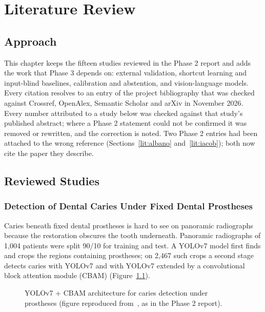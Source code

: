 \chapter{Literature Review}
\label{ch:lit}

\section{Approach}

This chapter keeps the fifteen studies reviewed in the Phase 2 report and adds the work that Phase 3
depends on: external validation, shortcut learning and input-blind baselines, calibration and
abstention, and vision-language models. Every citation resolves to an entry of the project
bibliography that was checked against Crossref, OpenAlex, Semantic Scholar and arXiv in November
2026. Every number attributed to a study below was checked against that study's published abstract;
where a Phase 2 statement could not be confirmed it was removed or rewritten, and the correction is
noted. Two Phase 2 entries had been attached to the wrong reference (Sections~\ref{lit:albano}
and~\ref{lit:iacob}); both now cite the paper they describe.

\section{Reviewed Studies}

\subsection{Detection of Dental Caries Under Fixed Dental Prostheses~\cite{ayhan2025detection}}
 Caries beneath fixed dental prostheses is hard to see on panoramic
radiographs because the restoration obscures the tooth underneath.
 Panoramic radiographs of 1,004 patients were split 90/10 for training and
test. A YOLOv7 model first finds and crops the regions containing prostheses; on 2,467 such crops a
second stage detects caries with YOLOv7 and with YOLOv7 extended by a convolutional block attention
module (CBAM) (Figure~\ref{fig:lit-ayhan}).

\begin{figure}[!htbp]
\centering
{}
\caption[YOLOv7 + CBAM architecture for caries detection]{YOLOv7 + CBAM architecture for caries
detection under prostheses (figure reproduced from~\cite{ayhan2025detection}, as in the Phase 2
report).}
\label{fig:lit-ayhan}
\end{figure}


